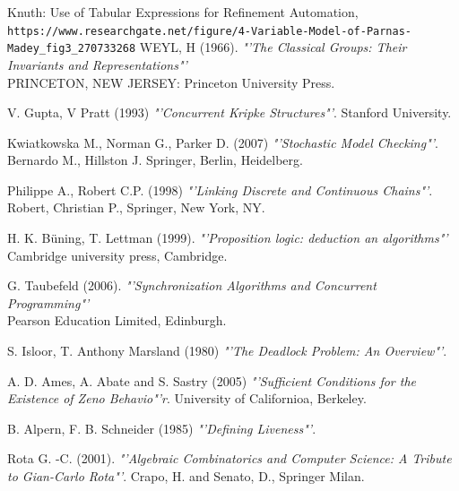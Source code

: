 \documentclass{article}%
\begin{document}
\clearpage  %





\begin{thebibliography}{9}


Knuth: Use of Tabular Expressions for Refinement Automation,
\\\texttt{https://www.researchgate.net/figure/4-Variable-Model-of-Parnas-Madey\_fig3\_270733268}
WEYL, H (1966).
\textit{"'The Classical Groups: Their Invariants and Representations"'}\\ 
PRINCETON, NEW JERSEY: Princeton University Press.

V. Gupta, V Pratt (1993)
\textit{"'Concurrent Kripke Structures"'}. 
Stanford University.

Kwiatkowska M., Norman G., Parker D. (2007)
\textit{"'Stochastic Model Checking"'}. 
Bernardo M., Hillston J. Springer, Berlin, Heidelberg.

Philippe A., Robert C.P. (1998)  
\textit{"'Linking Discrete and Continuous Chains"'}. 
Robert, Christian P., Springer, New York, NY.

H. K. Büning, T. Lettman (1999).
\textit{"'Proposition logic: deduction an algorithms"'}\\
Cambridge university press, Cambridge. 

G. Taubefeld (2006).
\textit{"'Synchronization Algorithms and Concurrent Programming"'}\\
Pearson Education Limited, Edinburgh. 

S. Isloor, T. Anthony Marsland (1980)
\textit{"'The Deadlock Problem: An Overview"'}. 

A. D. Ames, A. Abate and S. Sastry (2005)
\textit{"'Sufficient Conditions for the Existence of Zeno Behavio"'r}.
University of Californioa, Berkeley.

B. Alpern, F. B. Schneider (1985)
\textit{"'Defining Liveness"'}. 

Rota G. -C. (2001).
\textit{"'Algebraic Combinatorics and Computer Science: A Tribute to Gian-Carlo Rota"'}.
Crapo, H. and Senato, D., Springer Milan.


\end{thebibliography}
\end{document}
